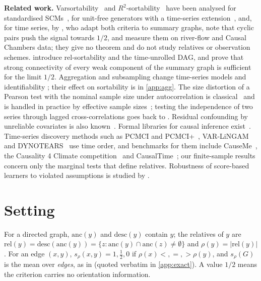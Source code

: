 \documentclass{article}
\theoremstyle{plain}
\theoremstyle{definition}
\theoremstyle{remark}
\newcommand{\rel}{\mathrm{rel}}
\newcommand{\anc}{\mathrm{anc}}
\newcommand{\desc}{\mathrm{desc}}
\newcommand{\srho}{s_\rho}
\begin{document}
\textbf{Related work.} Varsortability~\citep{reisach2021beware} and
$R^2$-sortability~\citep{reisach2023scale} have been analysed for standardised
SCMs~\citep{ormaniec2025standardizing}, for unit-free generators with a time-series
extension~\citep{herman2025unitless}, and, for time series, by
\citet{lohse2025sortability}, who adapt both criteria to summary graphs, note that
cyclic pairs push the signal towards $1/2$, and measure them on river-flow and Causal
Chambers data; they give no theorem and do not study relatives or observation
schemes. \citet{reisach2026topological} introduce rel-sortability and the
time-unrolled DAG, and prove that strong connectivity of every weak component of the
summary graph is sufficient for the limit $1/2$. Aggregation and subsampling change time-series models
\citep{weiss1984systematic,breitung2002temporal} and identifiability
\citep{gong2015subsampled,gong2017aggregated}; their effect on sortability is in
\cref{app:agg}. The size distortion of a Pearson test with the nominal sample size under
autocorrelation is classical~\citep{bartlett1935, clifford1989, roy1989} and is
handled in practice by effective sample sizes~\citep{runge2019detecting,
afyouni2019effective}; testing the independence of two series through lagged
cross-correlations goes back to \citet{haugh1976checking}. Residual confounding by
unreliable covariates is also known~\citep{westfall2016confounding}. Formal libraries
for causal inference exist~\citep{tan2026causalsmith}. Time-series discovery methods
such as PCMCI and PCMCI+~\citep{runge2019detecting,runge2020pcmciplus},
VAR-LiNGAM~\citep{hyvarinen2010varlingam} and DYNOTEARS~\citep{pamfil2020dynotears}
use time order, and benchmarks for them include CauseMe~\citep{runge2019inferring},
the Causality 4 Climate competition~\citep{weichwald2020causal} and
CausalTime~\citep{cheng2024causaltime}; our finite-sample results concern only the
marginal tests that define relatives. Robustness of score-based learners to
violated assumptions is studied by \citet{montagna2023assumption}.

\section{Setting}
\label{sec:setting}

For a directed graph, $\anc(y)$ and $\desc(y)$ contain $y$; the relatives of
$y$ are $\rel(y)=\desc(\anc(y))=\{z:\anc(y)\cap\anc(z)\neq\emptyset\}$ and
$\rho(y)=|\rel(y)|$. For an edge $(x,y)$, $\srho(x,y)=1,\tfrac12,0$ if
$\rho(x)<,=,>\rho(y)$, and $\srho(G)$ is the mean over \emph{edges}, as in
\citet[Eq.~(4)]{reisach2026topological} (quoted verbatim in \cref{app:exact}).
A value $1/2$ means the criterion carries no orientation information.
\end{document}

